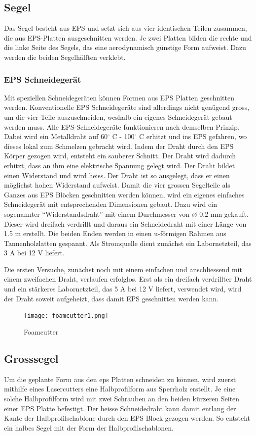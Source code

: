 \subsection{Segel}
Das Segel besteht aus EPS und setzt sich aus vier identischen Teilen zusammen, die aus EPS-Platten ausgeschnitten werden. Je zwei Platten bilden die rechte und die linke Seite des Segels, das eine aerodynamisch günstige Form aufweist. Dazu werden die beiden Segelhälften verklebt.
\subsubsection*{EPS Schneidegerät}
Mit speziellen Schneidegeräten können Formen aus EPS Platten geschnitten werden. Konventionelle EPS Schneidegeräte sind allerdings nicht genügend gross, um die vier Teile auszuschneiden, weshalb ein eigenes Schneidegerät gebaut werden muss. Alle EPS-Schneidegeräte funktionieren nach demselben Prinzip. Dabei wird ein Metalldraht auf  60$^\circ$ C - 100$^\circ$ C erhitzt und ins EPS gefahren, wo dieses lokal zum Schmelzen gebracht wird. Indem der Draht durch den EPS Körper gezogen wird, entsteht ein sauberer Schnitt. Der Draht wird dadurch erhitzt, dass an ihm eine elektrische Spannung gelegt wird. Der Draht bildet einen Widerstand und wird heiss. Der Draht ist so ausgelegt, dass er einen möglichst hohen Widerstand aufweist. 
Damit die  vier grossen Segelteile als Ganzes aus EPS Blöcken geschnitten werden können, wird ein eigenes einfaches Schneidegerät mit entsprechenden Dimensionen gebaut.  Dazu wird ein sogenannter \enquote{Widerstandsdraht} mit einem Durchmesser von $\varnothing$ 0.2 mm gekauft. Dieser wird dreifach verdrillt und daraus ein Schneidedraht mit einer Länge von 1.5 m erstellt. Die beiden Enden werden in einen u-förmigen Rahmen aus Tannenholzlatten gespannt. Als Stromquelle dient zunächst ein Labornetzteil, das 3 A bei 12 V liefert. 

Die ersten Versuche, zunächst noch mit einem einfachen und anschliessend mit einem zweifachen Draht, verlaufen erfolglos. Erst als ein dreifach verdrillter Draht und ein stärkeres Labornetzteil, das 5 A bei 12 V liefert, verwendet wird, wird der Draht soweit aufgeheizt, dass damit EPS geschnitten werden kann.     
\begin{figure}[H]
    \centering
    \texttt{[image: foamcutter1.png]}
    \caption{Foamcutter}
    \label{fig:enter-label}
\end{figure}
\subsection*{Grosssegel}
Um die geplante Form aus den \ac{eps} Platten schneiden zu können, wird zuerst mithilfe eines Lasercutters eine Halbprofilform aus Sperrholz erstellt. Je eine solche Halbprofilform wird mit zwei Schrauben an den beiden kürzeren Seiten einer EPS Platte  befestigt. Der heisse Schneidedraht kann damit entlang der Kante der Halbprofilschablone durch den EPS Block gezogen werden. So entsteht ein halbes Segel mit der Form der Halbprofilschablonen. \\


